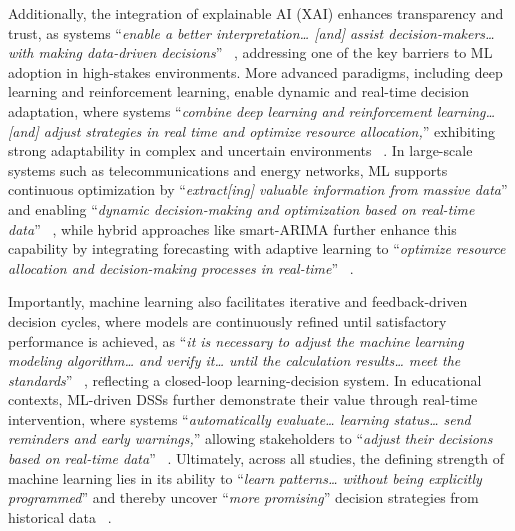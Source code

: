 \documentclass{sfuthesis}
\begin{document}
Additionally, the integration of explainable AI (XAI) enhances transparency and trust, as systems “\textit{enable a better interpretation… [and] assist decision-makers… with making data-driven decisions}” ~\cite{leem2023towards}, addressing one of the key barriers to ML adoption in high-stakes environments. More advanced paradigms, including deep learning and reinforcement learning, enable dynamic and real-time decision adaptation, where systems “\textit{combine deep learning and reinforcement learning… [and] adjust strategies in real time and optimize resource allocation,}” exhibiting strong adaptability in complex and uncertain environments ~\cite{miao2025research}. In large-scale systems such as telecommunications and energy networks, ML supports continuous optimization by “\textit{extract[ing] valuable information from massive data}” and enabling “\textit{dynamic decision-making and optimization based on real-time data}” ~\cite{miao2025research}, while hybrid approaches like smart-ARIMA further enhance this capability by integrating forecasting with adaptive learning to “\textit{optimize resource allocation and decision-making processes in real-time}” ~\cite{krishnan2024data}.\par
Importantly, machine learning also facilitates iterative and feedback-driven decision cycles, where models are continuously refined until satisfactory performance is achieved, as “\textit{it is necessary to adjust the machine learning modeling algorithm… and verify it… until the calculation results… meet the standards}” ~\cite{song2024building}, reflecting a closed-loop learning-decision system. In educational contexts, ML-driven DSSs further demonstrate their value through real-time intervention, where systems “\textit{automatically evaluate… learning status… send reminders and early warnings,}” allowing stakeholders to “\textit{adjust their decisions based on real-time data}” ~\cite{song2024building}. Ultimately, across all studies, the defining strength of machine learning lies in its ability to “\textit{learn patterns… without being explicitly programmed}” and thereby uncover “\textit{more promising}” decision strategies from historical data ~\cite{feng2024adaptive}.
\end{document}
